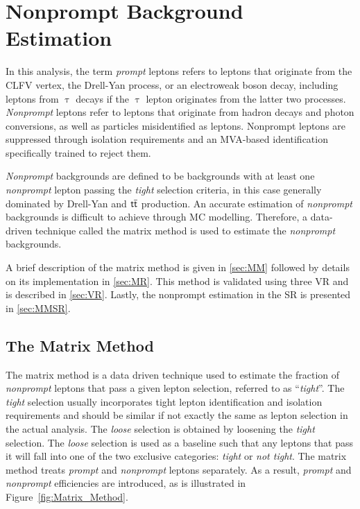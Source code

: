 \chapter{Nonprompt Background Estimation}
\label{chap:Nonprompt}

In this analysis, the term \emph{prompt} leptons refers to leptons that originate from the \ac{CLFV} vertex, the Drell-Yan process, or an electroweak boson decay, including leptons from $\uptau$ decays if the $\uptau$ lepton originates from the latter two processes. \emph{Nonprompt} leptons refer to leptons that originate from hadron decays and photon conversions, as well as particles misidentified as leptons. Nonprompt leptons are suppressed through isolation requirements and an MVA-based identification specifically trained to reject them.

\emph{Nonprompt} backgrounds are defined to be backgrounds with at least one \emph{nonprompt} lepton passing the \emph{tight} selection criteria, in this case generally dominated by Drell-Yan and $\textsf{t}\overline{\textsf{t}}$ production. An accurate estimation of \emph{nonprompt} backgrounds is difficult to achieve through MC modelling. Therefore, a data-driven technique called the matrix method is used to estimate the \emph{nonprompt} backgrounds. 

A brief description of the matrix method is given in \autoref{sec:MM} followed by details on its implementation in \autoref{sec:MR}. This method is validated using three \ac{VR} and is described in \autoref{sec:VR}. Lastly, the nonprompt estimation in the \ac{SR} is presented in \autoref{sec:MMSR}.
\section{The Matrix Method}
\label{sec:MM}

The matrix method \cite{Gillam:2014xua} is a data driven technique used to estimate the fraction of \emph{nonprompt} leptons that pass a given lepton selection, referred to as ``\emph{tight}''. The \emph{tight} selection usually incorporates tight lepton identification and isolation requirements and should be similar if not exactly the same as lepton selection in the actual analysis. The \emph{loose} selection is obtained by loosening the \emph{tight} selection. The \emph{loose} selection is used as a baseline such that any leptons that pass it will fall into one of the two exclusive categories: \emph{tight} or \emph{not tight}. The matrix method treats \emph{prompt} and \emph{nonprompt} leptons separately. As a result, \emph{prompt} and \emph{nonprompt} efficiencies are introduced, as is illustrated in Figure~\ref{fig:Matrix_Method}.

